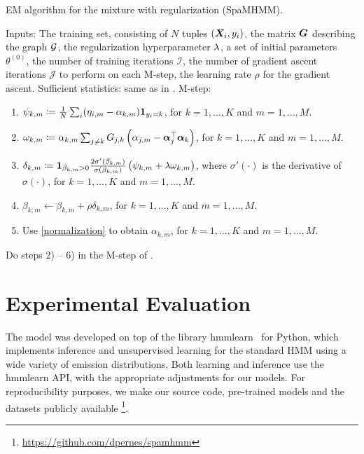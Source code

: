 \begin{algorithm}
	\caption{EM algorithm for the mixture with regularization (SpaMHMM).}
	\label{alg:spamhmm}
	\begin{algorithmic}
		\State Inputs: The training set, consisting of $N$ tuples $({\bm{X}}_i,y_i)$, the matrix ${\bm{G}}$ describing the graph ${\mathcal{G}}$, the regularization hyperparameter $\lambda$, a set of initial parameters $\theta^{(0)}$, the number of training iterations $\mathcal{I}$, the number of gradient ascent iterations $\mathcal{J}$ to perform on each M-step, the learning rate $\rho$ for the gradient ascent.
		\State Sufficient statistics: same as in .
		\State M-step:
		\begin{enumerate}
			\item $\psi_{k,m} \coloneqq \frac{1}{N}\sum_i (\eta_{i,m} - \alpha_{k,m}) \bm{1}_{y_i=k}$, for $k=1,\dots,K$ and $m=1,\dots,M$.
			\item $\omega_{k,m} \coloneqq \alpha_{k,m} \sum_{j \neq k} {G}_{j,k}\left(\alpha_{j,m} - {\bm{\alpha}}_j ^\top {\bm{\alpha}}_k \right)$, for $k=1,\dots,K$ and $m=1,\dots,M$.
			\item $\delta_{k,m} \coloneqq \bm{1}_{\beta_{k,m} > 0} \frac{2\sigma'(\beta_{k,m})}{\sigma(\beta_{k,m})}\left(\psi_{k,m} + \lambda \omega_{k,m}\right)$, where $\sigma'(\cdot)$ is the derivative of $\sigma(\cdot)$, for $k=1,\dots,K$ and $m=1,\dots,M$. 
			\item $\beta_{k,m} \leftarrow \beta_{k,m} + \rho \delta_{k,m}$, for $k=1,\dots,K$ and $m=1,\dots,M$.
			\item Use \eqref{normalization} to obtain $\alpha_{k,m}$, for $k=1,\dots,K$ and $m=1,\dots,M$.
		\end{enumerate}
		\EndFor
		\State Do steps 2) -- 6) in the M-step of . 
		\EndFor
	\end{algorithmic}
\end{algorithm}

\section{Experimental Evaluation}
\label{sec:experiments}
The model was developed on top of the library hmmlearn~\citet{hmmlearn} for Python, which implements inference and unsupervised learning for the standard HMM using a wide variety of emission distributions. Both learning and inference use the hmmlearn API, with the appropriate adjustments for our models. For reproducibility purposes, we make our source code, pre-trained models and the datasets publicly available \footnote{\url{https://github.com/dpernes/spamhmm}}.

